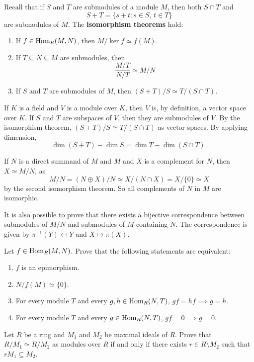 Recall that if $S$ and $T$ are submodules of a module $M$, then 
both $S\cap T$ and 
\[
S+T=\{s+t:s\in S,\,t\in T\}
\]
are submodules of $M$. 
The \textbf{isomorphism theorems} hold:
\begin{enumerate}
	\item If $f\in\operatorname{Hom}_R(M,N)$, then $M/\ker f\simeq f(M)$.
	\item If $T\subseteq N\subseteq M$ are submodules, then  
	\[
	\frac{M/T}{N/T}\simeq M/N
	\]
	\item If $S$ and $T$ are submodules of $M$, then $(S+T)/S\simeq T/(S\cap T)$. 
\end{enumerate}

\begin{example}
If $K$ is a field and $V$ is a module over $K$, then $V$ is, by definition, a vector space over $K$. 
If $S$ and $T$ are subspaces of $V$, then they are submodules of $V$. 
By the isomorphism theorem, $(S+T)/S\simeq T/(S\cap T)$ 
as vector spaces. By applying dimension,  
\[
\dim(S+T)-\dim S=\dim T-\dim(S\cap T).
\]
\end{example}

\begin{example}
If $N$ is a direct summand of $M$ and $M$ and $X$ is a complement for $N$, then $X\simeq M/N$, as
\[
M/N=(N\oplus X)/N\simeq X/(N\cap X)=X/\{0\}\simeq X
\]
by the second isomorphism theorem. So all complements of $N$ in $M$ are isomorphic. 
\end{example}

It is also possible to prove that there exists a bijective correspondence between
submodules of $M/N$ and submodules of $M$ containing $N$. The correspondence is given by 
$\pi^{-1}(Y)\mapsfrom Y$ and $X\mapsto \pi(X)$. 

\begin{exercise}
Let $f\in\operatorname{Hom}_R(M,N)$. Prove that the following statements are equivalent: 
\begin{enumerate}
\item $f$ is an epimorphism.
\item $N/f(M)\simeq\{0\}$. 
\item For every module $T$ and every $g,h\in\operatorname{Hom}_R(N,T)$, $g f=h f\implies g=h$.
\item For every module $T$ and every $g\in\operatorname{Hom}_R(N,T)$, $g f=0\implies g=0$. 
\end{enumerate}
\end{exercise}

\begin{exercise}
\label{xca:mod_iso_max}
    Let $R$ be a ring and $M_1$ and $M_2$ be maximal ideals of $R$. Prove that
    $R/M_1\simeq R/M_2$ as modules over $R$ if and only if there exists
    $r\in R\setminus M_2$ such that $rM_1\subseteq M_2$. 
\end{exercise}





